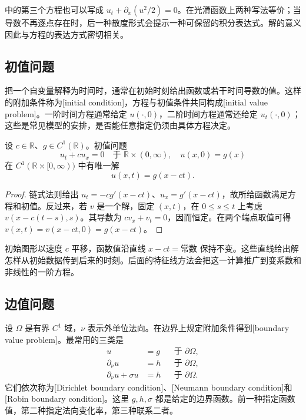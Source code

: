 中的第三个方程也可以写成 \(u_t+\partial_x(u^2/2)=0\)。在光滑函数上两种写法等价；当导数不再逐点存在时，后一种散度形式会提示一种可保留的积分表达式。解的意义因此与方程的表达方式密切相关。

\subsection{初值问题}
\label{b2:subsec:010403}

把一个自变量解释为时间时，通常在初始时刻给出函数或若干时间导数的值。这样的附加条件称为[initial condition]，方程与初值条件共同构成[initial value problem]。一阶时间方程通常给定 \(u(\cdot,0)\)，二阶时间方程通常还给定 \(u_t(\cdot,0)\)；这些是常见模型的安排，是否能任意指定仍须由具体方程决定。

\begin{proposition}\label{b2:prop:01-transport-initial}
设 \(c\in\mathbb R\)、\(g\in C^1(\mathbb R)\)。初值问题
\[
u_t+c u_x=0\quad\text{于 }\mathbb R\times(0,\infty),
\quad u(x,0)=g(x)
\]
在 \(C^1(\mathbb R\times[0,\infty))\) 中有唯一解
\[
u(x,t)=g(x-ct).
\]
\end{proposition}
\begin{proof}
链式法则给出 \(u_t=-c g'(x-ct)\)、\(u_x=g'(x-ct)\)，故所给函数满足方程和初值。反过来，若 \(v\) 是一个解，固定 \((x,t)\)，在 \(0\leq s\leq t\) 上考虑 \(v(x-c(t-s),s)\)。其导数为 \(c v_x+v_t=0\)，因而恒定。在两个端点取值可得 \(v(x,t)=v(x-ct,0)=g(x-ct)\)。
\end{proof}

初始图形以速度 \(c\) 平移，函数值沿直线 \(x-ct=\text{常数}\) 保持不变。这些直线给出解怎样从初始数据传到后来的时刻。后面的特征线方法会把这一计算推广到变系数和非线性的一阶方程。

\subsection{边值问题}
\label{b2:subsec:010404}

设 \(\Omega\) 是有界 \(C^1\) 域，\(\nu\) 表示外单位法向。在边界上规定附加条件得到[boundary value problem]。最常用的三类是
\begin{align*}
u&=g &&\text{于 }\partial\Omega,\\
\partial_\nu u&=h &&\text{于 }\partial\Omega,\\
\partial_\nu u+\sigma u&=h &&\text{于 }\partial\Omega.
\end{align*}
它们依次称为[Dirichlet boundary condition]、[Neumann boundary condition]和[Robin boundary condition]。这里 \(g,h,\sigma\) 都是给定的边界函数。前一种指定函数值，第二种指定法向变化率，第三种联系二者。

